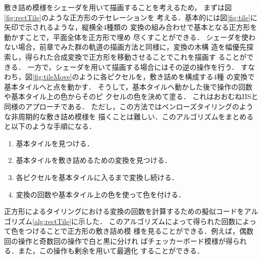 敷き詰め模様をシェーダを用いて描画することを考えるため，
まずは図\ref{fig:rectTile}のような正方形のテセレーションを
考える．基本的には図\ref{fig:tile}に矢印で示されるような，縦横全4種類の
変換の組み合わせで基本となる正方形を動かすことで，平面全体を正方形で埋め
尽くすことができる．
シェーダを使わない場合，前章でみた群の軌道の描画方法と同様に，変換の木構
造を幅優先探索し，得られた合成変換で正方形を移動させることでこれを描画す
ることができる．
一方で，シェーダを用いて描画する場合にはその逆の操作を行う．
すなわち，図\ref{fig:tileMove}のように各ピクセルを，敷き詰めを構成する4種
の変換で基本タイルへと点を動かす．
そうして，基本タイルへ動かした後で操作の回数や基本タイル上の色からそのピ
クセルの色を決めて塗る．
これはおおむねIISと同様のアプローチである．
ただし，この方法ではペンローズタイリングのような非周期的な敷き詰め模様を
描くことは難しい．このアルゴリズムをまとめると以下のような手順になる．
\begin{enumerate}
 \item 基本タイルを見つける．
 \item 基本タイルを敷き詰めるための変換を見つける．
 \item 各ピクセルを基本タイルに入るまで変換し続ける．
 \item 変換の回数や基本タイル上の色を使って色を付ける．
\end{enumerate}
正方形によるタイリングにおける変換の回数を計算するための擬似コードをアル
ゴリズム\ref{alg:rectTile}に示した．
このアルゴリズムによって得られた回数によって色をつけることで正方形の敷き詰め模
様を見ることができる．例えば，偶数回の操作と奇数回の操作で白と黒に分けれ
ばチェッカーボード模様が得られる．また，この操作も剰余を用いて最適化
することができる．

